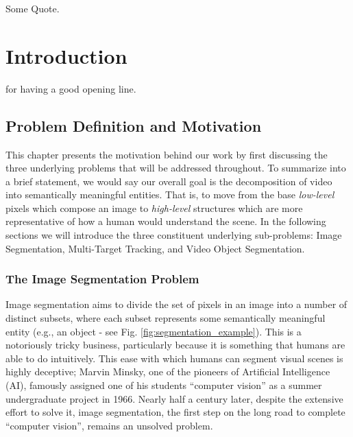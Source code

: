 \begin{savequote}[75mm]
Some Quote.
\end{savequote}


\chapter{Introduction}
 for having a good opening line.
\section{Problem Definition and Motivation}
This chapter presents the motivation behind our work by first discussing the three underlying problems that will be addressed throughout. To summarize into a brief statement, we would say our overall goal is the decomposition of video into semantically meaningful entities. That is, to move from the base \emph{low-level} pixels which compose an image to \emph{high-level} structures which are more representative of how a human would understand the scene. In the following sections we will introduce the three constituent underlying sub-problems: Image Segmentation, Multi-Target Tracking, and Video Object Segmentation.


\subsection{The Image Segmentation Problem}
Image segmentation aims to divide the set of pixels in an image into a number of distinct subsets, where each subset represents some semantically meaningful entity (e.g., an object - see Fig. \ref{fig:segmentation_example}). This is a notoriously tricky business, particularly because it is something that humans are able to do intuitively. This ease with which humans can segment visual scenes is highly deceptive; Marvin Minsky, one of the pioneers of Artificial Intelligence (AI), famously assigned one of his students ``computer vision'' as a summer undergraduate project in 1966. Nearly half a century later, despite the extensive effort to solve it, image segmentation, the first step on the long road to complete ``computer vision'', remains an unsolved problem. 


